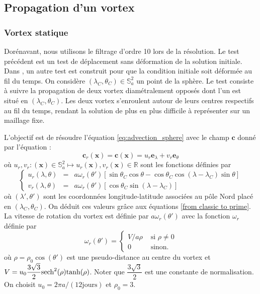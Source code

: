\subsection{Propagation d'un vortex}
\label{sec:propag_vortex}

\subsubsection{Vortex statique}

Dorénavant, nous utilisons le filtrage d'ordre 10 lors de la résolution. Le test précédent est un test de déplacement sans déformation de la solution initiale. Dans \cite{Nair2002}, un autre test est construit pour que la condition initiale soit déformée au fil du temps.
On considère $(\lambda_C, \theta_C) \in \mathbb{S}_a^2$ un point de la sphère. Le test consiste à suivre la propagation de deux vortex diamétralement opposés dont l'un est situé en $(\lambda_C, \theta_C)$. Les deux vortex s'enroulent autour de leurs centres respectifs au fil du temps, rendant la solution de plus en plus difficile à représenter sur un maillage fixe.

L'objectif est de résoudre l'équation \eqref{eq:advection_sphere} avec le champ $\mathbf{c}$ donné par l'équation :
\begin{equation}
\mathbf{c}_r(\mathbf{x}) = \mathbf{c}(\mathbf{x}) = u_r \mathbf{e}_{\lambda} + v_r \mathbf{e}_{\theta}
\label{eq:rotation_vortex}
\end{equation}
où $u_r, v_r : (\mathbf{x}) \in \mathbb{S}_a^2 \mapsto u_r(\mathbf{x}), v_r(\mathbf{x}) \in \mathbb{R}$ sont les fonctions définies par
\begin{equation}
\left\lbrace
\begin{array}{rcl}
u_r(\lambda, \theta) & = & a \omega_r(\theta') \left[ \sin \theta_C \cos \theta - \cos \theta_C \cos (\lambda - \lambda_C) \sin \theta \right] \\
v_r(\lambda, \theta) & = & a \omega_r (\theta') \left[\cos \theta_C \sin (\lambda - \lambda_C)  \right]
\end{array}
\right.
\end{equation}
où $(\lambda', \theta')$ sont les coordonnées longitude-latitude associées au pôle Nord placé en $(\lambda_C, \theta_C)$. On déduit ces valeurs grâce aux équations \eqref{from classic to prime}.
La vitesse de rotation du vortex est définie par $a \omega_r(\theta')$ avec la fonction $\omega_r$ définie par
\begin{equation}
\omega_r(\theta') = \left\lbrace
\begin{array}{cl}
V/a\rho & \text{ si } \rho \neq 0 \\
0 & \text{ sinon.}
\end{array}
\right.
\end{equation}
où $\rho = \rho_0 \cos (\theta')$ est une pseudo-distance au centre du vortex et $V=u_0 \dfrac{3 \sqrt{3}}{2} \text{sech}^2 (\rho) \text{tanh} (\rho)$. Noter que $\dfrac{3 \sqrt{3}}{2}$ est une constante de normalisation. On choisit $u_0 = 2 \pi a / (12 \text{jours})$ et $\rho_0 = 3$.

